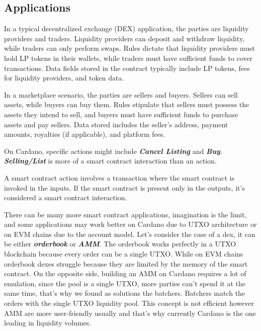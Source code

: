 \subsection{Applications}

In a typical decentralized exchange (DEX) application, the parties are liquidity providers and traders. Liquidity providers can deposit and withdraw liquidity, while traders can only perform swaps. Rules dictate that liquidity providers must hold LP tokens in their wallets, while traders must have sufficient funds to cover transactions. Data fields stored in the contract typically include LP tokens, fees for liquidity providers, and token data.

In a marketplace scenario, the parties are sellers and buyers. Sellers can sell assets, while buyers can buy them. Rules stipulate that sellers must possess the assets they intend to sell, and buyers must have sufficient funds to purchase assets and pay sellers. Data stored includes the seller's address, payment amounts, royalties (if applicable), and platform fees.

On Cardano, specific actions might include \textbf{\textit{Cancel Listing}} and \textbf{\textit{Buy}}. \textbf{\textit{Selling/List}} is more of a smart contract interaction than an action.

\begin{remark}
  A smart contract action involves a transaction where the smart contract is invoked in the inputs. If the smart contract is present only in the outputs, it's considered a smart contract interaction.
\end{remark}

There can be many more smart contract applications, imagination is the limit, and some applications may work better on Cardano due to UTXO architecture or on EVM chains due to the account model.
Let's consider the case of a dex, it can be either \textbf{\textit{\gls{orderbook}}} or \textbf{\textit{\gls{AMM}}}. The orderbook works perfectly in a UTXO blockchain because every order can be a single UTXO.
While on EVM chains orderbook dexes struggle because they are limited by the memory of the smart contract.
On the opposite side, building an AMM on Cardano requires a lot of emulation, since the pool is a single UTXO, more parties can't spend it at the same time, that's why we found as solutions the batchers.
Batchers match the orders with the single UTXO liquidity pool.
This concept is not efficient however AMM are more user-friendly usually and that's why currently Cardano is the one leading in liquidity volumes.

